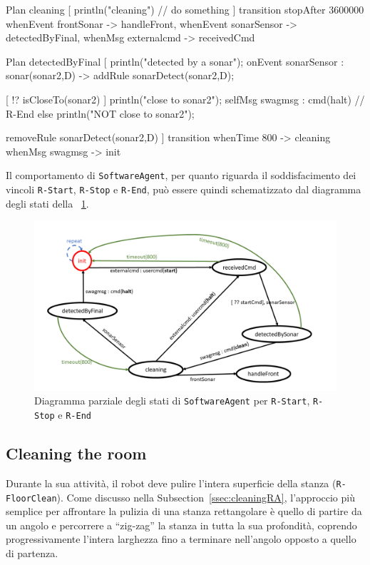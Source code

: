 \documentclass{../llncs}
\newcommand{\code}[1]{{\color{blue}\small{\texttt{#1}}}}
\newcommand{\xss}[1]{\subsectionname~\ref{ssec:#1}}
\newcommand{\labelfig}[1]{\label{fig:#1}}
\newcommand{\xf}[1]{\figurename~\ref{fig:#1}}
\newcommand{\subsectionname}{Subsection}
\begin{document}
\begin{qacode}[caption={SoftwareAgent, pt3}]
Plan cleaning [
	println("cleaning")
	// do something
]
transition stopAfter 3600000 
	whenEvent frontSonar -> handleFront,
	whenEvent sonarSensor -> detectedByFinal,
	whenMsg externalcmd -> receivedCmd
\end{qacode}

\begin{qacode}[caption={SoftwareAgent, pt4}]
Plan detectedByFinal [
	println("detected by a sonar");
	onEvent sonarSensor : sonar(sonar2,D) -> addRule sonarDetect(sonar2,D);

	[ !? isCloseTo(sonar2) ] {
		println("close to sonar2");
		selfMsg swagmsg : cmd(halt) // R-End
	}
	else
		println("NOT close to sonar2");
	
	removeRule sonarDetect(sonar2,D)
]
transition
	whenTime 800 -> cleaning
	whenMsg swagmsg -> init
\end{qacode}

Il comportamento di \texttt{SoftwareAgent}, per quanto riguarda il soddisfacimento dei vincoli \code{R-Start}, \code{R-Stop} e \code{R-End}, può essere quindi schematizzato dal diagramma degli stati della \xf{fsmStartStopEnd}.

\begin{figure}[!htb]
\centering
\includegraphics[scale=0.4]{img/stateDiagramStartStopEnd.png}
\caption{Diagramma parziale degli stati di \texttt{SoftwareAgent} per \code{R-Start}, \code{R-Stop} e \code{R-End}}\labelfig{fsmStartStopEnd}
\end{figure}

\subsection{Cleaning the room}
Durante la sua attività, il robot deve pulire l'intera superficie della stanza (\code{R-FloorClean}). Come discusso nella \xss{cleaningRA}, l'approccio più semplice per affrontare la pulizia di una stanza rettangolare è quello di partire da un angolo e percorrere a ``zig-zag'' la stanza in tutta la sua profondità, coprendo progressivamente l'intera larghezza fino a terminare nell'angolo opposto a quello di partenza.
\end{document}
